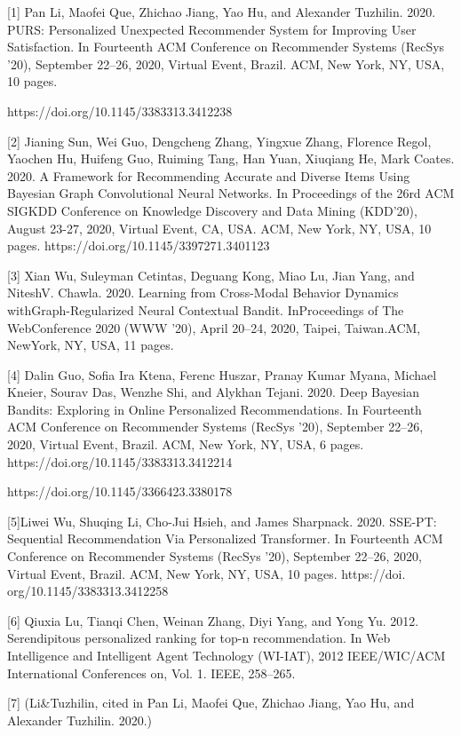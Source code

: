 \documentclass[english,twoside,censored,tkt]{HYthesisML}
\begin{document}
[1] Pan Li, Maofei Que, Zhichao Jiang, Yao Hu, and Alexander Tuzhilin. 2020. PURS: Personalized Unexpected Recommender System for Improving User Satisfaction. In Fourteenth ACM Conference on Recommender Systems (RecSys ’20), September 22–26, 2020, Virtual Event, Brazil. ACM, New York, NY, USA, 10 pages.
\begin{sloppypar}
https://doi.org/10.1145/3383313.3412238
\end{sloppypar}

[2] Jianing Sun, Wei Guo, Dengcheng Zhang, Yingxue Zhang, Florence Regol, Yaochen Hu, Huifeng Guo, Ruiming Tang, Han Yuan, Xiuqiang He, Mark Coates. 2020. A Framework for Recommending Accurate and Diverse Items Using Bayesian Graph Convolutional Neural Networks. In Proceedings of the 26rd ACM SIGKDD Conference on Knowledge Discovery and Data Mining (KDD’20), August 23-27, 2020, Virtual Event, CA, USA. ACM, New York, NY, USA, 10 pages. https://doi.org/10.1145/3397271.3401123

[3] Xian Wu, Suleyman Cetintas, Deguang Kong, Miao Lu, Jian Yang, and NiteshV. Chawla. 2020. Learning from Cross-Modal Behavior Dynamics withGraph-Regularized Neural Contextual Bandit. InProceedings of The WebConference 2020 (WWW ’20), April 20–24, 2020, Taipei, Taiwan.ACM, NewYork, NY, USA, 11 pages.

[4] Dalin Guo, Sofia Ira Ktena, Ferenc Huszar, Pranay Kumar Myana, Michael Kneier, Sourav Das, Wenzhe Shi, and Alykhan Tejani. 2020. Deep Bayesian Bandits: Exploring in Online Personalized Recommendations. In Fourteenth ACM Conference on Recommender Systems (RecSys ’20), September 22–26, 2020, Virtual Event, Brazil. ACM, New York, NY, USA, 6 pages. https://doi.org/10.1145/3383313.3412214

https://doi.org/10.1145/3366423.3380178

[5]Liwei Wu, Shuqing Li, Cho-Jui Hsieh, and James Sharpnack. 2020. SSE-PT:
Sequential Recommendation Via Personalized Transformer. In Fourteenth
ACM Conference on Recommender Systems (RecSys ’20), September 22–26,
2020, Virtual Event, Brazil. ACM, New York, NY, USA, 10 pages. https://doi.
org/10.1145/3383313.3412258

[6]	Qiuxia Lu, Tianqi Chen, Weinan Zhang, Diyi Yang, and Yong Yu. 2012. Serendipitous personalized ranking for top-n recommendation. In Web Intelligence and Intelligent Agent Technology (WI-IAT), 2012 IEEE/WIC/ACM International Conferences on, Vol. 1. IEEE, 258–265.

[7] (Li\&Tuzhilin, cited in Pan Li, Maofei Que, Zhichao Jiang, Yao Hu, and Alexander Tuzhilin. 2020.) 
\end{document}
